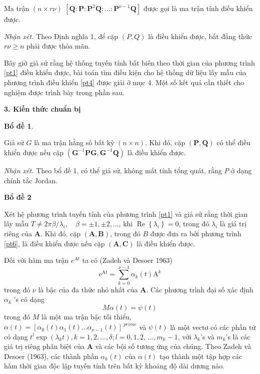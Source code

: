 \documentclass[12pt,a4paper]{article}
\begin{document}
Ma trận $(n \times r \nu)$ $\left[\mathbf{Q}: \mathbf{P}: \mathbf{P}^2 \mathbf{Q}: \ldots: \mathbf{P}^ {\nu-1} \mathbf{Q}\right]$ được gọi là ma trận tính điều khiển được.

\textit{Nhận xét.} Theo Định nghĩa 1, để cặp $(P, Q)$ là điều khiển được, bất đẳng thức $r \nu \geqslant n$ phải được thỏa mãn.

Bây giờ giả sử rằng hệ thống tuyến tính bất biến theo thời gian của phương trình \eqref{pt1} điều khiển được, bài toán tìm điều kiện cho hệ thống dữ liệu lấy mẫu của phương trình điều khiển \eqref{pt4}  được giải ở mục 4. Một số kết quả cần thiết cho nghiệm được trình bày trong phần sau.

\textbf{3. Kiến thức chuẩn bị}

\textbf{Bổ đề 1}. 

Giả sử $G$ là ma trận hằng số bất kỳ $(n \times n)$. Khi đó, cặp $(\mathbf{P}, \mathbf{Q})$ có thể điều khiển được nếu cặp $\left(\mathbf{G}^{-1} \mathbf{P G}, \mathbf{G}^{-1} \mathbf{Q}\right)$ là điều khiển được.

\textit{Nhận xét.} Theo bổ đề 1, có thể giả sử, không mất tính tổng quát, rằng $P$ ở dạng chính tắc Jordan.

\textbf{Bổ đề 2}

Xét hệ phương trình tuyến tính của phương trình \ref{pt1} và giả sử rằng thời gian lấy mẫu $T \neq 2 \pi \beta / \lambda_i, \quad \beta= \pm 1, \pm 2, \ldots$, khi $\operatorname{Re}\left\{ \lambda_i\right\}=0$, trong đó $\lambda_i$ là giá trị riêng của $\mathbf{A}$. Khi đó, cặp $(\mathbf{A}, \mathbf{B})$, trong đó $B$ được đưa ra bởi phương trình \ref{pt6}, là điều khiển được nếu cặp $(\mathbf{A}, \mathbf{C})$ là điều khiển được.

Đối với hàm ma trận $e^{At}$ ta có (Zadeh và Desoer 1963)
\begin{equation}\tag{7}\label{pt7}
\mathrm{e}^{\mathrm{A} t}=\sum_{k=0}^{\nu-1} \alpha_k(t) \mathrm{A}^k
\end{equation}
trong đó $\nu$ là bậc của đa thức nhỏ nhất của $\mathbf{A}$. Các phương trình đại số xác định $\alpha_k$ 's có dạng
$$
M \alpha(t)=\psi(t)
$$
trong đó $M$ là một ma trận bậc tối thiểu, $\alpha(t)=\left[\alpha_0(t) \alpha_1(t) \ldots \alpha_{\nu-1}(t)\right]^{\ prime}$ và $\psi(t)$ là một vectơ có các phần tử có dạng $t^l \exp \left(\lambda_k t\right), k=1,2, \ldots, \delta ; l=0,1,2$, $\ldots, m_k-1$, với $\lambda_k$'s và $m_k$'s là các giá trị riêng phân biệt của $\mathbf{A}$ và các bội số tương ứng của chúng. Theo Zadeh và Desoer (1963), các thành phần $\alpha_k(t)$ của $\alpha(t)$ tạo thành một tập hợp các hàm thời gian độc lập tuyến tính trên bất kỳ khoảng độ dài dương nào.
\end{document}
